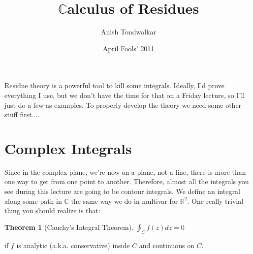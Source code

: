 \documentclass[11pt,notitlepage]{article}
\title{$\mathbb{C}$alculus of Residues}
\author{Anish Tondwalkar}
\date{April Fools' 2011}
\newtheorem{thm}{Theorem}[section]
\begin{document}
\maketitle
Residue theory is a powerful tool to kill some integrals. Ideally, I'd prove everything I use, but we don't have the time for that on a Friday lecture, so I'll just do a few as examples.  To properly develop the theory we need some other stuff first....
\section{Complex Integrals}
Since in the complex plane, we're now on a plane, not a line, there is more than one way to get from one point to another. Therefore, almost all the integrals you see during this lecture are going to be contour integrals. We define an integral along some path in $\mathbb{C}$ the same way we do in multivar for $\mathbb{R}^2$. One really trivial thing you should realize is that:
\begin{thm}[Cauchy's Integral Theorem]
$\oint_C f(z) dz = 0$ 
\end{thm}
\begin{flushright}
if $f$ is analytic (a.k.a.\! conservative) inside $C$ and continuous on $C$.
\end{flushright}
\end{document}
